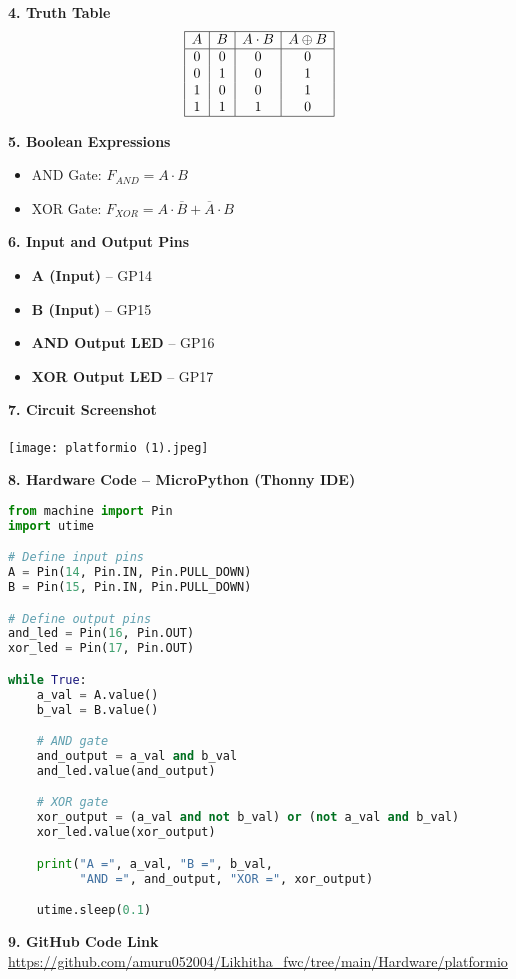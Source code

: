 \documentclass[12pt]{article}
\begin{document}
\begin{multicols}{2}
\vspace{1em}
\noindent\textbf{4. Truth Table}
\[
\begin{array}{|c|c|c|c|}
\hline
A & B & A \cdot B & A \oplus B \\
\hline
0 & 0 & 0 & 0 \\
0 & 1 & 0 & 1 \\
1 & 0 & 0 & 1 \\
1 & 1 & 1 & 0 \\
\hline
\end{array}
\]

\vspace{1em}
\noindent\textbf{5. Boolean Expressions}
\begin{itemize}
    \item AND Gate: \( F_{AND} = A \cdot B \)
    \item XOR Gate: \( F_{XOR} = A \cdot \overline{B} + \overline{A} \cdot B \)
\end{itemize}

\end{multicols}

\vspace{3em}
\noindent\textbf{6. Input and Output Pins}
\begin{itemize}
    \item \textbf{A (Input)} – GP14
    \item \textbf{B (Input)} – GP15
    \item \textbf{AND Output LED} – GP16
    \item \textbf{XOR Output LED} – GP17
\end{itemize}

\vspace{1em}
\noindent\textbf{7. Circuit Screenshot} \\
\\
\texttt{[image: platformio (1).jpeg]} %

\vspace{1em}
\noindent\textbf{8. Hardware Code – MicroPython (Thonny IDE)}
\begin{lstlisting}[language=Python]
from machine import Pin
import utime

# Define input pins
A = Pin(14, Pin.IN, Pin.PULL_DOWN)
B = Pin(15, Pin.IN, Pin.PULL_DOWN)

# Define output pins
and_led = Pin(16, Pin.OUT)
xor_led = Pin(17, Pin.OUT)

while True:
    a_val = A.value()
    b_val = B.value()

    # AND gate
    and_output = a_val and b_val
    and_led.value(and_output)

    # XOR gate
    xor_output = (a_val and not b_val) or (not a_val and b_val)
    xor_led.value(xor_output)

    print("A =", a_val, "B =", b_val, 
          "AND =", and_output, "XOR =", xor_output)

    utime.sleep(0.1)
\end{lstlisting}

\vspace{1em}
\noindent\textbf{9. GitHub Code Link} \\
\url{https://github.com/amuru052004/Likhitha_fwc/tree/main/Hardware/platformio}
\end{document}
